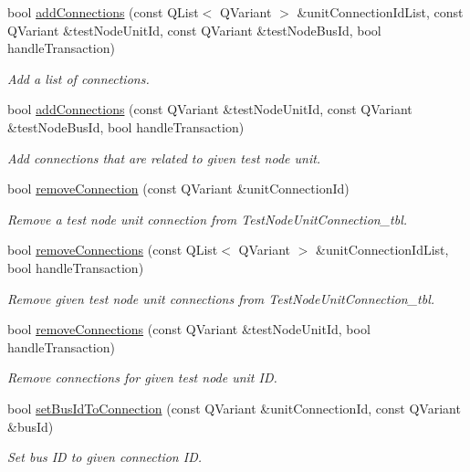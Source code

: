 \begin{DoxyCompactItemize}
bool \hyperlink{classmdt_tt_test_node_unit_a94fb2e68a3bdc156910ef103cbbe28f9}{add\-Connections} (const Q\-List$<$ Q\-Variant $>$ \&unit\-Connection\-Id\-List, const Q\-Variant \&test\-Node\-Unit\-Id, const Q\-Variant \&test\-Node\-Bus\-Id, bool handle\-Transaction)
\begin{DoxyCompactList}\small\item\em Add a list of connections. \end{DoxyCompactList}\item 
bool \hyperlink{classmdt_tt_test_node_unit_a69d8af3b7317ec6dee07d2ba860e2d3c}{add\-Connections} (const Q\-Variant \&test\-Node\-Unit\-Id, const Q\-Variant \&test\-Node\-Bus\-Id, bool handle\-Transaction)
\begin{DoxyCompactList}\small\item\em Add connections that are related to given test node unit. \end{DoxyCompactList}\item 
bool \hyperlink{classmdt_tt_test_node_unit_a80ecfabd0a6851c7542dc613d69cac26}{remove\-Connection} (const Q\-Variant \&unit\-Connection\-Id)
\begin{DoxyCompactList}\small\item\em Remove a test node unit connection from Test\-Node\-Unit\-Connection\-\_\-tbl. \end{DoxyCompactList}\item 
bool \hyperlink{classmdt_tt_test_node_unit_a31bde37340b294c0ee5b2f85a710f29e}{remove\-Connections} (const Q\-List$<$ Q\-Variant $>$ \&unit\-Connection\-Id\-List, bool handle\-Transaction)
\begin{DoxyCompactList}\small\item\em Remove given test node unit connections from Test\-Node\-Unit\-Connection\-\_\-tbl. \end{DoxyCompactList}\item 
bool \hyperlink{classmdt_tt_test_node_unit_ac9acc3c586a206192a7a5b9effa0d278}{remove\-Connections} (const Q\-Variant \&test\-Node\-Unit\-Id, bool handle\-Transaction)
\begin{DoxyCompactList}\small\item\em Remove connections for given test node unit I\-D. \end{DoxyCompactList}\item 
bool \hyperlink{classmdt_tt_test_node_unit_a4a7a0c1fcc670a7a5e518e76508fe915}{set\-Bus\-Id\-To\-Connection} (const Q\-Variant \&unit\-Connection\-Id, const Q\-Variant \&bus\-Id)
\begin{DoxyCompactList}\small\item\em Set bus I\-D to given connection I\-D. \end{DoxyCompactList}\end{DoxyCompactItemize}
